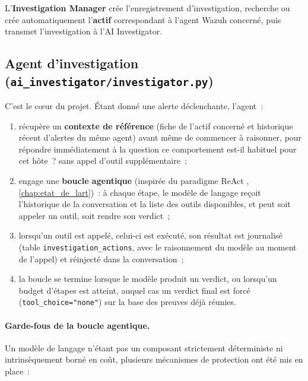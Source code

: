 L'\textbf{Investigation Manager} crée l'enregistrement d'investigation,
recherche ou crée automatiquement l'\textbf{actif} correspondant à l'agent
Wazuh concerné, puis transmet l'investigation à l'AI Investigator.

\subsection{Agent d'investigation (\texttt{ai\_investigator/investigator.py})}

C'est le cœur du projet. Étant donné une alerte déclenchante, l'agent~:

\begin{enumerate}
  \item récupère un \textbf{contexte de référence} (fiche de l'actif
        concerné et historique récent d'alertes du même agent) avant même
        de commencer à raisonner, pour répondre immédiatement à la question
        \og ce comportement est-il habituel pour cet hôte~?\fg{} sans appel
        d'outil supplémentaire~;
  \item engage une \textbf{boucle agentique} (inspirée du paradigme ReAct
        \cite{react2022}, \cref{chap:etat_de_lart})~: à chaque étape, le
        modèle de langage reçoit l'historique de la conversation et la
        liste des outils disponibles, et peut soit appeler un outil, soit
        rendre son verdict~;
  \item lorsqu'un outil est appelé, celui-ci est exécuté, son résultat est
        journalisé (table \texttt{investigation\_actions}, avec le
        raisonnement du modèle au moment de l'appel) et réinjecté dans la
        conversation~;
  \item la boucle se termine lorsque le modèle produit un verdict, ou
        lorsqu'un budget d'étapes est atteint, auquel cas un verdict final
        est forcé (\texttt{tool\_choice="none"}) sur la base des preuves
        déjà réunies.
\end{enumerate}

\paragraph{Garde-fous de la boucle agentique.} Un modèle de langage
n'étant pas un composant strictement déterministe ni intrinsèquement borné
en coût, plusieurs mécanismes de protection ont été mis en place~:

